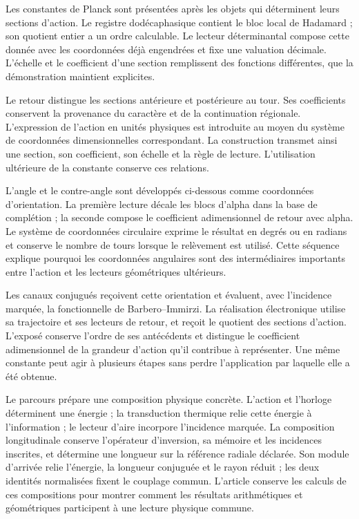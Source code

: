 
Les constantes de Planck sont présentées après les objets qui
déterminent leurs sections d’action. Le registre dodécaphasique contient le
bloc local de Hadamard ; son quotient entier a un ordre calculable.
Le lecteur déterminantal compose cette donnée avec les coordonnées déjà engendrées
et fixe une valuation décimale. L’échelle et le coefficient d’une section
remplissent des fonctions différentes, que la démonstration maintient explicites.

Le retour distingue les sections antérieure et postérieure au tour.
Ses coefficients conservent la provenance du caractère et de la
continuation régionale. L’expression de l’action en unités physiques
est introduite au moyen du système de coordonnées dimensionnelles correspondant. La
construction transmet ainsi une section, son coefficient, son échelle et la
règle de lecture. L’utilisation ultérieure de la constante conserve ces
relations.

L’angle et le contre-angle sont développés ci-dessous comme coordonnées
d’orientation. La première lecture décale les blocs d’alpha dans la base
de complétion ; la seconde compose le coefficient adimensionnel de
retour avec alpha. Le système de coordonnées circulaire exprime le résultat en degrés ou en
radians et conserve le nombre de tours lorsque le
relèvement est utilisé. Cette séquence explique pourquoi les coordonnées angulaires
sont des intermédiaires importants entre l’action et les lecteurs
géométriques ultérieurs.

Les canaux conjugués reçoivent cette orientation et évaluent, avec
l’incidence marquée, la fonctionnelle de Barbero--Immirzi.
La réalisation électronique utilise sa trajectoire et ses lecteurs de
retour, et reçoit le quotient des sections d’action. L’exposé conserve
l’ordre de ses antécédents et distingue le coefficient adimensionnel
de la grandeur d’action qu’il contribue à représenter. Une même
constante peut agir à plusieurs étapes sans perdre l’application par laquelle
elle a été obtenue.

Le parcours prépare une composition physique concrète. L'action et l'horloge déterminent une énergie ; la transduction thermique relie cette énergie à l'information ; le lecteur d'aire incorpore l'incidence marquée. La composition longitudinale conserve l'opérateur d'inversion, sa mémoire et les incidences inscrites, et détermine une longueur sur la référence radiale déclarée. Son module d'arrivée relie l'énergie, la longueur conjuguée et le rayon réduit ; les deux identités normalisées fixent le couplage commun. L'article conserve les calculs de ces compositions pour montrer comment les résultats arithmétiques et géométriques participent à une lecture physique commune.
